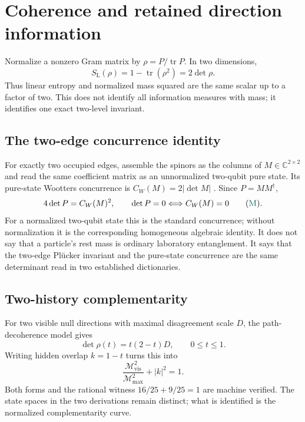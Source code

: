\documentclass[11pt]{article}
\newcommand{\Mtag}{\textcolor{verified}{\textsc{M}}}
\newcommand{\tr}{\operatorname{tr}}
\newcommand{\C}{\mathbb{C}}
\newcommand{\Mass}{\mathcal{M}}
\begin{document}
\section{Coherence and retained direction information}

Normalize a nonzero Gram matrix by $\rho=P/\tr P$.  In two dimensions,
\begin{equation}\label{eq:linent}
  S_{\mathrm L}(\rho)=1-\tr(\rho^2)=2\det\rho.
\end{equation}
Thus linear entropy and normalized mass squared are the same scalar up to a
factor of two.  This does not identify all information measures with mass; it
identifies one exact two-level invariant.

\subsection{The two-edge concurrence identity}

For exactly two occupied edges, assemble the spinors as the columns of
$M\in\C^{2\times2}$ and read the same coefficient matrix as an unnormalized
two-qubit pure state.  Its pure-state Wootters concurrence is
$C_W(M)=2|\det M|$ \cite{Wootters}.  Since $P=MM^\dagger$,
\begin{equation}\label{eq:concurrence}
 4\det P=C_W(M)^2,
 \qquad
 \det P=0\Longleftrightarrow C_W(M)=0
 \qquad(\Mtag).
\end{equation}
For a normalized two-qubit state this is the standard concurrence; without
normalization it is the corresponding homogeneous algebraic identity.  It does
not say that a particle's rest mass is ordinary laboratory entanglement.  It
says that the two-edge Pl\"ucker invariant and the pure-state concurrence are
the same determinant read in two established dictionaries.

\subsection{Two-history complementarity}

For two visible null directions with maximal disagreement scale $D$, the
path-decoherence model gives
\begin{equation}\label{eq:pathmass}
  \det\rho(t)=t(2-t)D,
  \qquad 0\leq t\leq1.
\end{equation}
Writing hidden overlap $k=1-t$ turns this into
\begin{equation}\label{eq:duality}
  \frac{\Mass^2_{\mathrm{vis}}}{\Mass^2_{\max}}+|k|^2=1.
\end{equation}
Both forms and the rational witness $16/25+9/25=1$ are machine verified.  The
state spaces in the two derivations remain distinct; what is identified is the
normalized complementarity curve.
\end{document}
